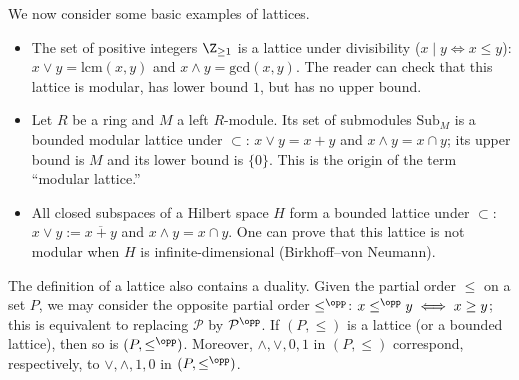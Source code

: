 We now consider some basic examples of lattices.
\begin{itemize}
	\item The set of positive integers $\Z_{\geq1}$ is a lattice under
	divisibility ($x\mid y\iff x\leq y$):
	$x\vee y=\mathrm{lcm}(x,y)$ and $x\wedge y=\mathrm{gcd}(x,y)$. The reader
	can check that this lattice is modular, has lower bound $1$, but has no
	upper bound.

	\item Let $R$ be a ring and $M$ a left $R$-module. Its set of submodules
	$\mathrm{Sub}_M$ is a bounded modular lattice under $\subset$:
	$x\vee y=x+y$ and $x\wedge y=x\cap y$; its upper bound is $M$ and its lower
	bound is $\{0\}$. This is the origin of the term ``modular lattice.''

	\item All closed subspaces of a Hilbert space $H$ form a bounded lattice
	under $\subset$: $x\vee y:=\overline{x+y}$ and $x\wedge y=x\cap y$. One can
	prove that this lattice is not modular when $H$ is infinite-dimensional
	(Birkhoff--von Neumann).
\end{itemize}

\begin{remark}\label{rem:lattice-duality}
	The definition of a lattice also contains a duality. Given the partial order
	$\leq$ on a set $P$, we may consider the opposite partial order
	$\leq^{\opp}$: $x\leq^{\opp}y\iff x\geq y$; this is equivalent to replacing
	$\mathcal{P}$ by $\mathcal{P}^{\opp}$. If $(P,\leq)$ is a lattice (or a
	bounded lattice), then so is $(P,\leq^{\opp})$. Moreover, $\wedge,\vee,0,1$
	in $(P,\leq)$ correspond, respectively, to $\vee,\wedge,1,0$ in
	$(P,\leq^{\opp})$.
\end{remark}

